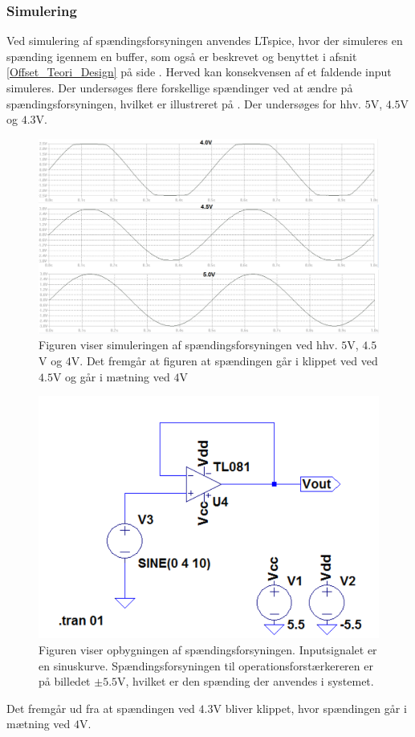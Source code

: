 \subsubsection{Simulering}
Ved simulering af spændingsforsyningen anvendes LTspice, hvor der simuleres en spænding igennem en buffer, som også er beskrevet og benyttet i afsnit \ref{Offset_Teori_Design} på side \pageref{Offset_Teori_Design}. Herved kan konsekvensen af et faldende input simuleres. Der undersøges flere forskellige spændinger ved at ændre på spændingsforsyningen, hvilket er illustreret på . Der undersøges for hhv. $5$V, $4.5$V og $4.3$V.
\begin{figure}[H]
	\centering
	\includegraphics[scale=0.4]{figures/cProblemloesning/Spaendingsforsyning.PNG}
	\caption{Figuren viser simuleringen af spændingsforsyningen ved hhv. $5$V, $4.5$V og $4$V. Det fremgår at figuren at spændingen går i klippet ved ved $4.5$V og går i mætning ved $4$V}
	\label{fig:spaendingsforsyning_graf}
\end{figure}
\begin{figure}[H]
	\centering
	\includegraphics[scale=0.5]{figures/cProblemloesning/Spaendingsforsyning_LTspice.PNG}
	\caption{Figuren viser opbygningen af spændingsforsyningen. Inputsignalet er en sinuskurve. Spændingsforsyningen til operationsforstærkereren er på billedet $\pm5.5$V, hvilket er den spænding der anvendes i systemet.}
	\label{fig:spaendingsforsyning}
\end{figure}
Det fremgår ud fra  at spændingen ved $4.3$V bliver klippet, hvor spændingen går i mætning ved $4$V. 


